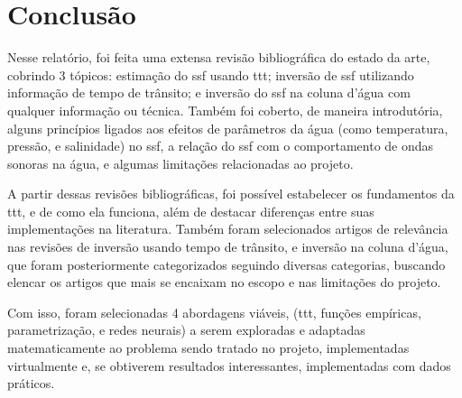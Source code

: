 \section{Conclusão}

Nesse relatório, foi feita uma extensa revisão bibliográfica do estado da arte, cobrindo 3 tópicos: estimação do \gls{ssf} usando \gls{ttt}; inversão de \gls{ssf} utilizando informação de tempo de trânsito; e inversão do \gls{ssf} na coluna d'água com qualquer informação ou técnica. Também foi coberto, de maneira introdutória, alguns princípios ligados aos efeitos de parâmetros da água (como temperatura, pressão, e salinidade) no \gls{ssf}, a relação do \gls{ssf} com o comportamento de ondas sonoras na água, e algumas limitações relacionadas ao projeto.

A partir dessas revisões bibliográficas, foi possível estabelecer os fundamentos da \gls{ttt}, e de como ela funciona, além de destacar diferenças entre suas implementações na literatura. Também foram selecionados artigos de relevância nas revisões de inversão usando tempo de trânsito, e inversão na coluna d'água, que foram posteriormente categorizados seguindo diversas categorias, buscando elencar os artigos que mais se encaixam no escopo e nas limitações do projeto.

Com isso, foram selecionadas 4 abordagens viáveis, (\gls{ttt}, funções empíricas, parametrização, e redes neurais) a serem exploradas e adaptadas matematicamente ao problema sendo tratado no projeto, implementadas virtualmente e, se obtiverem resultados interessantes, implementadas com dados práticos.